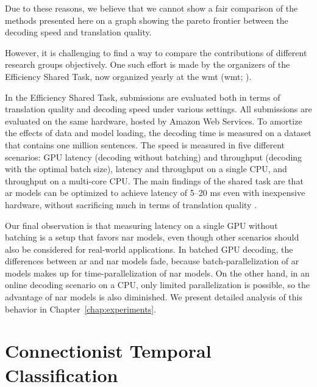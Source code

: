 Due to these reasons, we believe that we cannot show a fair comparison of the
methods presented here on a graph showing the pareto frontier between the
decoding speed and translation quality.

However, it is challenging to find a way to compare the contributions of
different research groups objectively. One such effort is made by the
organizers of the Efficiency Shared Task, now organized yearly at the \acl{wmt}
(\acs{wmt}; \citealp{heafield-etal-2020-findings,
  heafield-etal-2021-findings}).

In the Efficiency Shared Task, submissions are evaluated both in terms of
translation quality and decoding speed under various settings. All submissions
are evaluated on the same hardware, hosted by Amazon Web Services.  To amortize
the effects of data and model loading, the decoding time is measured on a
dataset that contains one million sentences. The speed is measured in five
different scenarios: GPU latency (decoding without batching) and throughput
(decoding with the optimal batch size), latency and throughput on a single CPU,
and throughput on a multi-core CPU. The main findings of the shared task are
that \acl{ar} models can be optimized to achieve latency of 5--20 ms even with
inexpensive hardware, without sacrificing much in terms of translation quality
\citep{heafield-etal-2021-findings}.

Our final observation is that measuring latency on a single GPU without
batching is a setup that favors \ac{nar} models, even though other scenarios
should also be considered for real-world applications. In batched GPU decoding,
the differences between \ac{ar} and \ac{nar} models fade, because
batch-parallelization of \ac{ar} models makes up for time-parallelization of
\ac{nar} models. On the other hand, in an online decoding scenario on a CPU,
only limited parallelization is possible, so the advantage of \ac{nar} models
is also diminished. We present detailed analysis of this behavior in
Chapter~\ref{chap:experiments}.


\chapter{Connectionist Temporal Classification}%
\label{chap:nar-nmt-ctc}


